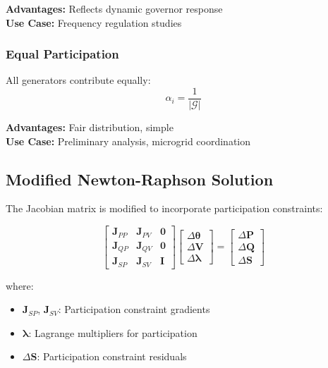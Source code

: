 \documentclass[11pt]{article}
\begin{document}
\textbf{Advantages:} Reflects dynamic governor response\\
\textbf{Use Case:} Frequency regulation studies

\subsubsection{Equal Participation}
All generators contribute equally:
\begin{equation}
\alpha_i = \frac{1}{|\mathcal{G}|}
\end{equation}

\textbf{Advantages:} Fair distribution, simple\\
\textbf{Use Case:} Preliminary analysis, microgrid coordination

\subsection{Modified Newton-Raphson Solution}

The Jacobian matrix is modified to incorporate participation constraints:

\begin{equation}
\begin{bmatrix}
\mathbf{J}_{PP} & \mathbf{J}_{PV} & \mathbf{0} \\
\mathbf{J}_{QP} & \mathbf{J}_{QV} & \mathbf{0} \\
\mathbf{J}_{SP} & \mathbf{J}_{SV} & \mathbf{I}
\end{bmatrix}
\begin{bmatrix}
\Delta \boldsymbol{\theta} \\
\Delta \mathbf{V} \\
\Delta \boldsymbol{\lambda}
\end{bmatrix}
=
\begin{bmatrix}
\Delta \mathbf{P} \\
\Delta \mathbf{Q} \\
\Delta \mathbf{S}
\end{bmatrix}
\end{equation}

where:
\begin{itemize}
    \item $\mathbf{J}_{SP}$, $\mathbf{J}_{SV}$: Participation constraint gradients
    \item $\boldsymbol{\lambda}$: Lagrange multipliers for participation
    \item $\Delta \mathbf{S}$: Participation constraint residuals
\end{itemize}
\end{document}
